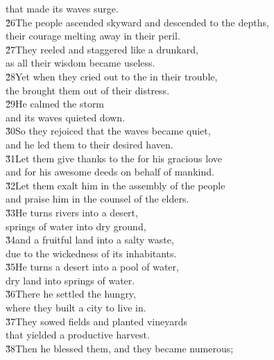 \begin{poetry}
\poemll    that made its waves surge. \\
\poeml \v{26}The people ascended skyward and descended to the depths, \\
\poemll    their courage melting away in their peril. \\
\poeml \v{27}They reeled and staggered like a drunkard, \\
\poemll    as all their wisdom became useless. \\
\poeml \v{28}Yet when they cried out to the  in their trouble, \\
\poemll    the  brought them out of their distress. \\
\poeml \v{29}He calmed the storm \\
\poemll    and its waves quieted down. \\
\poeml \v{30}So they rejoiced that the waves became quiet, \\
\poemll    and he led them to their desired haven. \\
\poeml \v{31}Let them give thanks to the  for his gracious love \\
\poemll    and for his awesome deeds on behalf of mankind. \\
\poeml \v{32}Let them exalt him in the assembly of the people \\
\poemll    and praise him in the counsel of the elders. \\
\poeml \v{33}He turns rivers into a desert, \\
\poemll    springs of water into dry ground, \\
\poeml \v{34}and a fruitful land into a salty waste, \\
\poemll    due to the wickedness of its inhabitants. \\
\poeml \v{35}He turns a desert into a pool of water, \\
\poemll    dry land into springs of water. \\
\poeml \v{36}There he settled the hungry, \\
\poemll    where they built a city to live in. \\
\poeml \v{37}They sowed fields and planted vineyards \\
\poemll    that yielded a productive harvest. \\
\poeml \v{38}Then he blessed them, and they became numerous; \\

\end{poetry}
